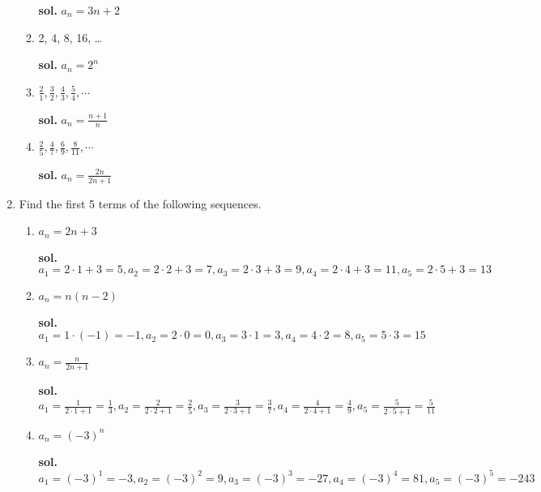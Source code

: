 \documentclass{report}
\begin{document}
\begin{multicols}{2}
\begin{enumerate}
\begin{enumerate}
                  \textbf{sol{}.} $a_{n} = 3n+2$

            \item 2, 4, 8, 16, \ldots

                  \textbf{sol{}.} $a_{n} = 2^{n}$

            \item $\frac{2}{1}, \frac{3}{2}, \frac{4}{3}, \frac{5}{4}, \cdots$

                  \textbf{sol{}.} $a_{n} = \frac{n+1}{n}$

            \item $\frac{2}{5}, \frac{4}{7}, \frac{6}{9}, \frac{8}{11}, \cdots$

                  \textbf{sol{}.} $a_{n} = \frac{2n}{2n+1}$
          \end{enumerate}

    \item Find the first 5 terms of the following sequences.

          \begin{enumerate}
            \item $a_{n} = 2n+3$

                  \textbf{sol{}.}
                  $a_{1} = 2\cdot1+3 = 5, a_{2} = 2\cdot2+3 = 7, a_{3} = 2\cdot3+3 = 9, a_{4}
                    = 2\cdot4+3 = 11, a_{5} = 2\cdot5+3 = 13$

            \item $a_{n} = n(n-2)$

                  \textbf{sol{}.}
                  $a_{1} = 1\cdot(-1) = -1, a_{2} = 2\cdot0 = 0, a_{3} = 3\cdot1 = 3, a_{4}
                    = 4\cdot2 = 8, a_{5} = 5\cdot3 = 15$

            \item $a_{n} = \frac{n}{2n+1}$

                  \textbf{sol{}.}
                  $a_{1} = \frac{1}{2\cdot1+1}= \frac{1}{3}, a_{2} = \frac{2}{2\cdot2+1}= \frac{2}{5}
                    , a_{3} = \frac{3}{2\cdot3+1}= \frac{3}{7}, a_{4} = \frac{4}{2\cdot4+1}=
                    \frac{4}{9}, a_{5} = \frac{5}{2\cdot5+1}= \frac{5}{11}$

            \item $a_{n} = {{(-3)}}^{n}$

                  \textbf{sol{}.}
                  $a_{1} = {(-3)}^{1} = -3, a_{2} = {(-3)}^{2} = 9, a_{3} = {(-3)}^{3} = -27, a_{4}
                      = {(-3)}^{4} = 81, a_{5} = {(-3)}^{5} = -243$
          \end{enumerate}


\end{enumerate}
\end{multicols}
\end{document}
